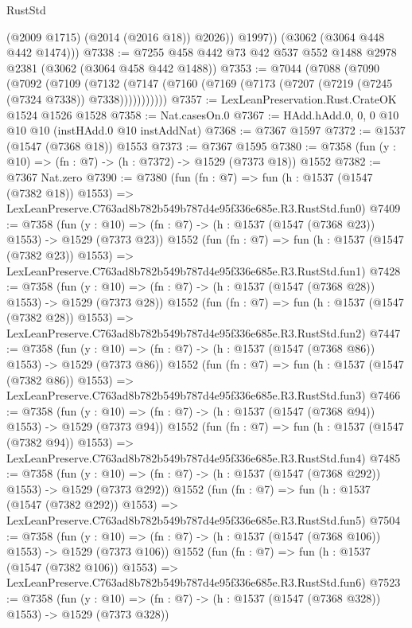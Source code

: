\begin{lexlean}{RustStd}
\begin{coremodule}
              (@2009 @1715)
              (@2014 (@2016 @18))
              @2026))
          @1997))
      (@3062 (@3064 @448 @442 @1474)))
@7338 := @7255 @458 @442 @73 @42 @537 @552 @1488 @2978 @2381 (@3062 (@3064 @458 @442 @1488))
@7353 := @7044
    (@7088
      (@7090
        (@7092
          (@7109
            (@7132 (@7147 (@7160 (@7169 (@7173 (@7207 (@7219 (@7245 (@7324 @7338)) @7338)))))))))))
@7357 := LexLeanPreservation.Rust.CrateOK @1524 @1526 @1528
@7358 := Nat.casesOn.{0}
@7367 := HAdd.hAdd.{0, 0, 0} @10 @10 @10 (instHAdd.{0} @10 instAddNat)
@7368 := @7367 @1597
@7372 := @1537 (@1547 (@7368 @18)) @1553
@7373 := @7367 @1595
@7380 := @7358 (fun (y : @10) => (fn : @7) -> (h : @7372) -> @1529 (@7373 @18)) @1552
@7382 := @7367 Nat.zero
@7390 := @7380
    (fun (fn : @7) =>
    fun (h : @1537 (@1547 (@7382 @18)) @1553) =>
    LexLeanPreserve.C763ad8b782b549b787d4e95f336e685e.R3.RustStd.fun0)
@7409 := @7358
    (fun (y : @10) => (fn : @7) -> (h : @1537 (@1547 (@7368 @23)) @1553) -> @1529 (@7373 @23))
    @1552
    (fun (fn : @7) =>
    fun (h : @1537 (@1547 (@7382 @23)) @1553) =>
    LexLeanPreserve.C763ad8b782b549b787d4e95f336e685e.R3.RustStd.fun1)
@7428 := @7358
    (fun (y : @10) => (fn : @7) -> (h : @1537 (@1547 (@7368 @28)) @1553) -> @1529 (@7373 @28))
    @1552
    (fun (fn : @7) =>
    fun (h : @1537 (@1547 (@7382 @28)) @1553) =>
    LexLeanPreserve.C763ad8b782b549b787d4e95f336e685e.R3.RustStd.fun2)
@7447 := @7358
    (fun (y : @10) => (fn : @7) -> (h : @1537 (@1547 (@7368 @86)) @1553) -> @1529 (@7373 @86))
    @1552
    (fun (fn : @7) =>
    fun (h : @1537 (@1547 (@7382 @86)) @1553) =>
    LexLeanPreserve.C763ad8b782b549b787d4e95f336e685e.R3.RustStd.fun3)
@7466 := @7358
    (fun (y : @10) => (fn : @7) -> (h : @1537 (@1547 (@7368 @94)) @1553) -> @1529 (@7373 @94))
    @1552
    (fun (fn : @7) =>
    fun (h : @1537 (@1547 (@7382 @94)) @1553) =>
    LexLeanPreserve.C763ad8b782b549b787d4e95f336e685e.R3.RustStd.fun4)
@7485 := @7358
    (fun (y : @10) => (fn : @7) -> (h : @1537 (@1547 (@7368 @292)) @1553) -> @1529 (@7373 @292))
    @1552
    (fun (fn : @7) =>
    fun (h : @1537 (@1547 (@7382 @292)) @1553) =>
    LexLeanPreserve.C763ad8b782b549b787d4e95f336e685e.R3.RustStd.fun5)
@7504 := @7358
    (fun (y : @10) => (fn : @7) -> (h : @1537 (@1547 (@7368 @106)) @1553) -> @1529 (@7373 @106))
    @1552
    (fun (fn : @7) =>
    fun (h : @1537 (@1547 (@7382 @106)) @1553) =>
    LexLeanPreserve.C763ad8b782b549b787d4e95f336e685e.R3.RustStd.fun6)
@7523 := @7358
    (fun (y : @10) => (fn : @7) -> (h : @1537 (@1547 (@7368 @328)) @1553) -> @1529 (@7373 @328))

\end{coremodule}
\end{lexlean}
